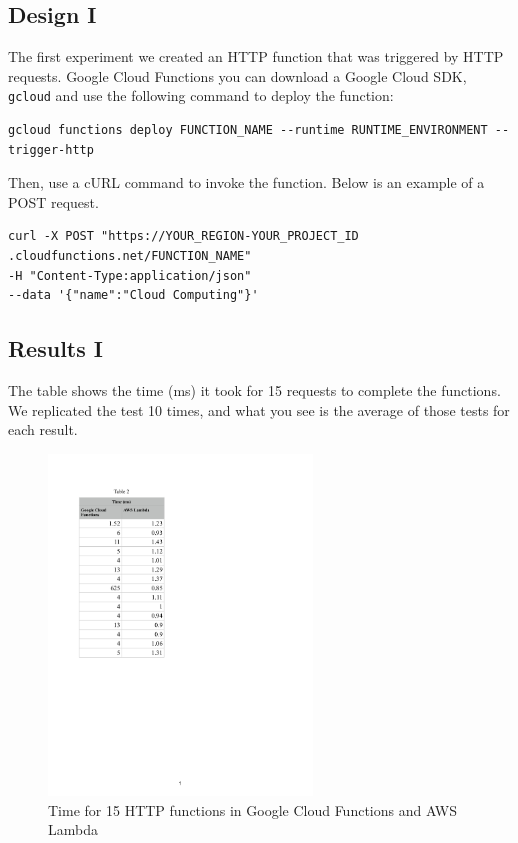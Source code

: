 \documentclass[10pt, conference]{IEEEtran}
\begin{document}
\subsection{Design I}
The first experiment we created an HTTP function that was triggered by HTTP requests. Google Cloud Functions you can download a Google Cloud SDK, \verb|gcloud| and use the following command to deploy the function: 

\begin{lstlisting}
gcloud functions deploy FUNCTION_NAME --runtime RUNTIME_ENVIRONMENT --trigger-http
\end{lstlisting}

Then, use a cURL command to invoke the function. Below is an example of a POST request. 
\begin{lstlisting}
curl -X POST "https://YOUR_REGION-YOUR_PROJECT_ID
.cloudfunctions.net/FUNCTION_NAME" 
-H "Content-Type:application/json" 
--data '{"name":"Cloud Computing"}'
\end{lstlisting}

\subsection{Results I}
The table shows the time (ms) it took for 15 requests to complete the functions. We replicated the test 10 times, and what you see is the average of those tests for each result. 

\begin{figure}[htbp]
\centerline{\includegraphics[width=7cm]{table2.PDF}}
\caption{Time for 15 HTTP functions in Google Cloud Functions and AWS Lambda}
\label{fig}
\end{figure}
\end{document}
